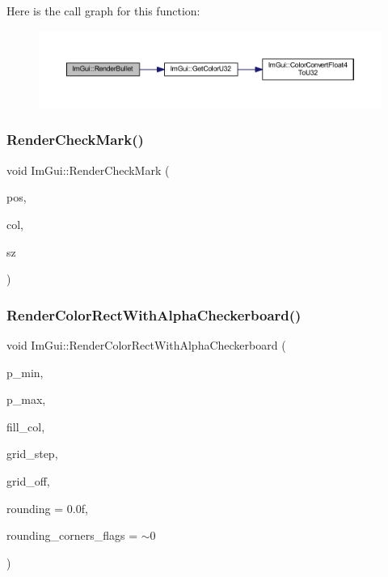 Here is the call graph for this function\+:
\nopagebreak
\begin{figure}[H]
\begin{center}
\leavevmode
\includegraphics[width=350pt]{namespace_im_gui_a2d0e4160081b3953fc8f88e2d8e8da15_cgraph}
\end{center}
\end{figure}
\mbox{\label{namespace_im_gui_a6adfc430445ed42a65556ffb0d58a8b8}} 
\subsubsection{\texorpdfstring{Render\+Check\+Mark()}{RenderCheckMark()}}
{\footnotesize\ttfamily void Im\+Gui\+::\+Render\+Check\+Mark (\begin{DoxyParamCaption}\item[{\mbox{\hyperlink{struct_im_vec2}{Im\+Vec2}}}]{pos,  }\item[{\mbox{\hyperlink{imgui_8h_a118cff4eeb8d00e7d07ce3d6460eed36}{Im\+U32}}}]{col,  }\item[{float}]{sz }\end{DoxyParamCaption})}

\mbox{\label{namespace_im_gui_a4715686ee0c613e8518c0f5e92c358ce}} 
\subsubsection{\texorpdfstring{Render\+Color\+Rect\+With\+Alpha\+Checkerboard()}{RenderColorRectWithAlphaCheckerboard()}}
{\footnotesize\ttfamily void Im\+Gui\+::\+Render\+Color\+Rect\+With\+Alpha\+Checkerboard (\begin{DoxyParamCaption}\item[{\mbox{\hyperlink{struct_im_vec2}{Im\+Vec2}}}]{p\+\_\+min,  }\item[{\mbox{\hyperlink{struct_im_vec2}{Im\+Vec2}}}]{p\+\_\+max,  }\item[{\mbox{\hyperlink{imgui_8h_a118cff4eeb8d00e7d07ce3d6460eed36}{Im\+U32}}}]{fill\+\_\+col,  }\item[{float}]{grid\+\_\+step,  }\item[{\mbox{\hyperlink{struct_im_vec2}{Im\+Vec2}}}]{grid\+\_\+off,  }\item[{float}]{rounding = {\ttfamily 0.0f},  }\item[{int}]{rounding\+\_\+corners\+\_\+flags = {\ttfamily $\sim$0} }\end{DoxyParamCaption})}

